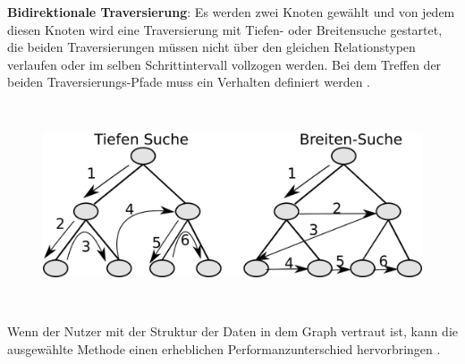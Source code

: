 \textbf {Bidirektionale Traversierung}: Es werden zwei Knoten gewählt und von jedem diesen Knoten wird eine Traversierung  mit Tiefen- oder Breitensuche gestartet, die beiden Traversierungen müssen nicht über den gleichen Relationstypen verlaufen oder im selben Schrittintervall vollzogen werden. Bei dem Treffen der beiden Traversierungs-Pfade muss ein Verhalten definiert werden .
\FloatBarrier
\begin{figure}[!htb]
	\centering
	\includegraphics [width=14cm, height=6cm]{Figures/New_Search.png}
	\caption[Breiten- und Tiefensuche]{}
	\label{fig:Search}
\end{figure} 
\FloatBarrier
\noindent Wenn der Nutzer mit der Struktur der Daten in dem Graph vertraut ist, kann die ausgewählte Methode einen erheblichen Performanzunterschied hervorbringen \parencite{vukotic2015neo4j}. 

